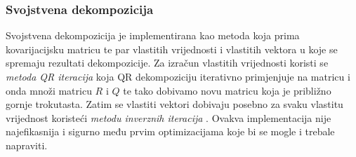 \documentclass[zavrsnirad, upload]{fer}
\begin{document}
\subsubsection{Svojstvena dekompozicija}
\label{sek:svojstvena_dekompozicija}
Svojstvena dekompozicija je implementirana kao metoda koja prima
kovarijacijsku matricu te par vlastitih vrijednosti i vlastitih vektora u koje
se spremaju rezultati dekompozicije.
Za izračun vlastitih vrijednosti koristi se \emph{metoda QR iteracija}
\cite{NLA} koja QR dekompoziciju
iterativno primjenjuje na matricu i onda množi
matricu $R$ i $Q$ te tako dobivamo novu matricu koja je
približno gornje trokutasta. Zatim se vlastiti vektori dobivaju
posebno za svaku vlastitu vrijednost koristeći \emph{metodu
inverznih iteracija} \cite{NLA}. Ovakva implementacija nije
najefikasnija i sigurno među prvim optimizacijama koje bi se mogle
i trebale napraviti.
\end{document}
